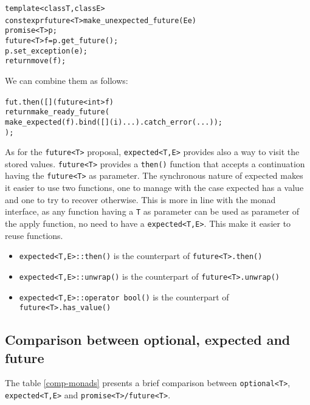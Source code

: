 \documentclass[a4paper,10pt]{article}
\newcommand{\cpp}[1]{\lstinline{#1}}
\begin{document}
\begin{alltt}
template <class T, class E>
constexpr future<T> make_unexpected_future(E e)  {
  promise<T> p;
  future<T> f = p.get_future();
  p.set_exception(e);
  return move(f);
}
\end{alltt}
\noindent
We can combine them as follows:

\begin{alltt}
fut.then([](future<int> f) { 
  return make_ready_future(
    make_expected(f).bind([](i){ ... }).catch_error(...));
  });
\end{alltt}

As for the \cpp{future<T>} proposal, \cpp{expected<T,E>} provides also a way to visit the stored values.
\cpp{future<T>} provides a \cpp{then()} function that accepts a continuation having the \cpp{future<T>} as parameter. The synchronous nature of expected makes it easier to use two functions, one to manage with the case expected has a value and one to try to recover otherwise. This is more in line with the monad interface, as any function having a \cpp{T} as parameter can be used as parameter of the apply function, no need to have a \cpp{expected<T,E>}. This make it easier to reuse functions. 

\begin{itemize}
 \item \cpp{expected<T,E>::then()} is the counterpart of \cpp{future<T>.then()}
 \item \cpp{expected<T,E>::unwrap()} is the counterpart of \cpp{future<T>.unwrap()}
 \item \cpp{expected<T,E>::operator bool()} is the counterpart of \cpp{future<T>.has_value()}
\end{itemize}

\subsection{Comparison between optional, expected and future}

The table \ref{comp-monads} presents a brief comparison between \cpp{optional<T>}, \cpp{expected<T,E>}  and \cpp{promise<T>/future<T>}.
\end{document}
